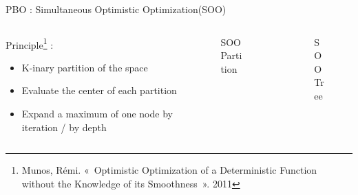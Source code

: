 \begin{frame}{PBO : Simultaneous Optimistic Optimization(SOO)}
    \begin{columns}[b]
        \begin{column}{0.4\textwidth}
            \begin{block}{Principle\footnote[6]{Munos, Rémi. « Optimistic Optimization of a Deterministic Function without the Knowledge of its Smoothness ». 2011} : }
                \begin{itemize}
                    \item K-inary partition of the space
                    \item Evaluate the center of each partition
                    \item Expand a maximum of one node by iteration / by depth
                \end{itemize}
            \end{block}
            
        \end{column}    

        \begin{column}[b]{0.27\textwidth}
            \begin{figure}[h]
                \centering
                \resizebox{\textwidth}{!}{
                    
                }
                \caption{SOO Partition}
            \end{figure}
        \end{column}

        \begin{column}[b]{0.33\textwidth}
            \begin{figure}[h]
                \centering
                \resizebox{\textwidth}{!}{
                    
                }
                \caption{SOO Tree}
            \end{figure}
        \end{column}
    \end{columns}
\end{frame}

